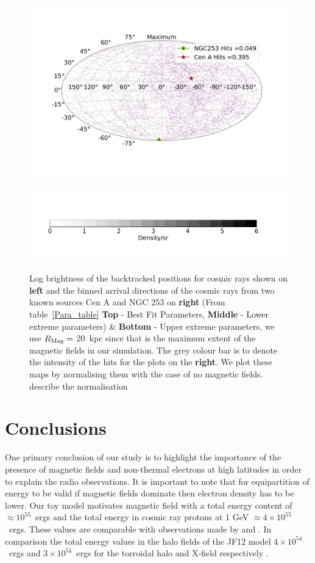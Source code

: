 \documentclass[usenatbib]{mnras}
\newcommand{\Vasu}[1]{{\color{purple}#1}}
\begin{document}
\begin{figure}
\includegraphics[width=0.49\linewidth]{Images/Bins_180_UB_N2_CenA_NGC253_Str_Tur_TM_40_EeV.png}\
\hspace*{+9cm}                                      \includegraphics[width=0.50\linewidth]{Images/Colorbar.png}
\caption{Log brightness of the backtracked positions for cosmic rays shown on \textbf{left} and the binned arrival directions of the cosmic rays from two known sources Cen A and NGC 253 on \textbf{right} (From table~\ref{Para_table} \textbf{Top} - Best Fit Parameters, {\textbf{Middle} - Lower extreme parameters)} \& {\textbf{Bottom} - Upper extreme parameters, we use $R_{\rm Mag} = $ 20~kpc since that is the maximum extent of the magnetic fields in our simulation. The grey colour bar is to denote the intensity of the hits for the plots on the \textbf{right}. We  plot these maps by normalising them with the case of no magnetic fields.}
\Vasu{describe the normalisation}}
\label{fig:AD_Plots}
\end{figure}

\section{Conclusions}
\label{Conclusions}
One primary conclusion of our study is to highlight the importance of the presence of magnetic fields and non-thermal electrons at high latitudes in order to explain the radio observations. It is important to note that for equipartition of energy \cite{Drury_2012} to be valid if magnetic fields dominate then electron density has to be lower.
Our toy model motivates magnetic field with a total energy content of $\approx 10^{55}$~ergs and the total energy in cosmic ray protons at 1 GeV $\approx 4\times 10^{55}$~ergs. These values are comparable with observations made by \cite{Su_2010} and \cite{eROSITA}. In comparison the total energy values in the halo fields of the JF12 model $4\times 10^{54}$~ergs and $3\times  10^{54}$~ergs for the torroidal halo and X-field respectively \cite{Taylor_2019}.
\end{document}
